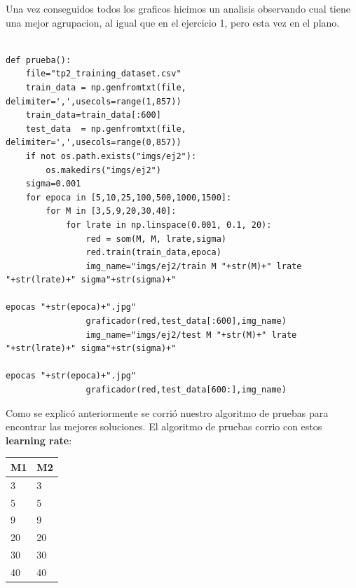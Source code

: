 Una vez conseguidos todos los graficos hicimos un analisis observando cual tiene una mejor agrupacion, al igual que en el ejercicio 1, pero esta vez en el plano.


\begin{lstlisting}[caption=pruebas]
	
def prueba():
	file="tp2_training_dataset.csv"
	train_data = np.genfromtxt(file, delimiter=',',usecols=range(1,857))
	train_data=train_data[:600]
	test_data  = np.genfromtxt(file, delimiter=',',usecols=range(0,857))
	if not os.path.exists("imgs/ej2"):
		os.makedirs("imgs/ej2")
	sigma=0.001
	for epoca in [5,10,25,100,500,1000,1500]:
		for M in [3,5,9,20,30,40]:
			for lrate in np.linspace(0.001, 0.1, 20):
				red = som(M, M, lrate,sigma)
				red.train(train_data,epoca)
				img_name="imgs/ej2/train M "+str(M)+" lrate "+str(lrate)+" sigma"+str(sigma)+" 
				                                                    epocas "+str(epoca)+".jpg"
				graficador(red,test_data[:600],img_name)
				img_name="imgs/ej2/test M "+str(M)+" lrate "+str(lrate)+" sigma"+str(sigma)+" 
				                                                   epocas "+str(epoca)+".jpg"
				graficador(red,test_data[600:],img_name)

\end{lstlisting}

Como se explic\'o anteriormente se corri\'o nuestro algoritmo de pruebas para encontrar las mejores soluciones. El algoritmo de pruebas corrio con estos \textbf{learning rate}:

\begin{tabular}{|l|l|}
\hline
M1 & M2 \\ \hline
3 & 3 \\ \hline
5 & 5 \\ \hline
9 & 9 \\ \hline
20 & 20 \\ \hline
30 & 30 \\ \hline
40 & 40 \\ \hline
\end{tabular}


